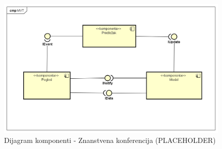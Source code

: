 			\begin{figure}[H]
			 	\includegraphics[width= 15 cm, height= 25 cm, keepaspectratio]{dijagrami/Component_Diagram_MVT.png} 
			 	\centering
			 	\caption{Dijagram komponenti - Znanstvena konferencija (PLACEHOLDER)}
			 	\label{fig:act4}
			 \end{figure}